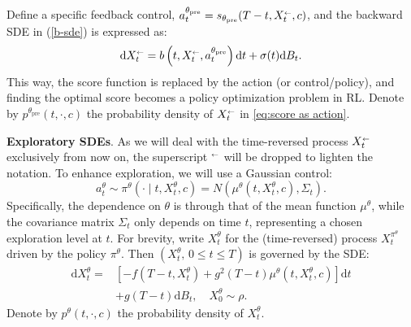 \documentclass{article}
\theoremstyle{plain}
\theoremstyle{definition}
\theoremstyle{remark}
\newcommand\sla{\scaleobj{0.8}{\leftarrow}}
\begin{document}
Define a specific feedback control, $a^{\theta_\text{pre}}_t= s_{\theta_{\text{pre}}}(T-t,  X^{\sla}_t,c)$,
and the backward SDE in (\ref{b-sde}) is expressed as:
\begin{equation}
\label{eq:score as action}
\mathrm{d} X^{\sla}_t = b\left(t, X^{\sla}_t, a^{\theta_\text{pre}}_t\right)\mathrm{d}t + \sigma(t) \mathrm{d}B_t.
\end{equation}
This way, the score function is replaced by the action (or control/policy), and finding the optimal score becomes a policy optimization problem in RL.
Denote by $p^{\theta_{\text{pre}}}(t,\cdot,c)$ the probability density of $X^{\sla}_t$ in \eqref{eq:score as action}.

\textbf{Exploratory SDEs}. %
As we will deal with the time-reversed process $X^{\sla}_t$ exclusively from now on, the superscript $^{\sla}$ will be 
dropped to lighten the notation. 
To enhance exploration, 
we will use a Gaussian control: 
\begin{equation}
\label{atht}
a^{\theta}_t \sim \pi^{\theta}(\cdot\mid t,X^{\theta}_t,c) = N(\mu^{\theta}(t,X^{\theta}_t,c),\Sigma_t ).
\end{equation}
Specifically, the dependence on $\theta$ is through that of the mean function $\mu^\theta$, while  
the covariance matrix $\Sigma_t$ only depends on time $t$, representing a chosen exploration level at $t$. 
For brevity, write $X^{\theta}_t$ for the (time-reversed) process $X^{\pi^{\theta}}_t$ driven by the policy $\pi^{\theta}$.
Then $(X^{\theta}_t, \, 0 \le t \le T)$ is governed by the SDE:
\begin{align}
\mathrm{d} X_t^{\theta}=&\left[-f(T-t,X_t^{\theta}) + g^2(T-t) \mu^{\theta}(t,X_t^{\theta},c)\right]\mathrm{d}t\nonumber\\
&+g(T-t)\mathrm{d}B_t,\quad X^{\theta}_0\sim\rho.
\end{align}
Denote by $p^{\theta}(t,\cdot,c)$ the probability density of $X_t^{\theta}$.
\end{document}
